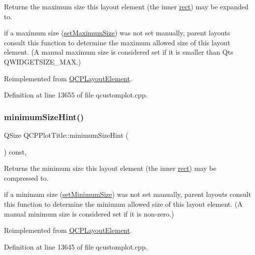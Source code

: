Returns the maximum size this layout element (the inner \hyperlink{class_q_c_p_layout_element_a208effccfe2cca4a0eaf9393e60f2dd4}{rect}) may be expanded to.

if a maximum size (\hyperlink{class_q_c_p_layout_element_a74eb5280a737ab44833d506db65efd95}{set\+Maximum\+Size}) was not set manually, parent layouts consult this function to determine the maximum allowed size of this layout element. (A manual maximum size is considered set if it is smaller than Qt\textquotesingle{}s Q\+W\+I\+D\+G\+E\+T\+S\+I\+Z\+E\+\_\+\+M\+AX.) 

Reimplemented from \hyperlink{class_q_c_p_layout_element_ab5ce2ba22b36d9a3b70a1be562c326e5}{Q\+C\+P\+Layout\+Element}.



Definition at line 13655 of file qcustomplot.\+cpp.

\mbox{\label{class_q_c_p_plot_title_aeed5454134516655723bf2d0499dea24}} 
\subsubsection{\texorpdfstring{minimum\+Size\+Hint()}{minimumSizeHint()}}
{\footnotesize\ttfamily Q\+Size Q\+C\+P\+Plot\+Title\+::minimum\+Size\+Hint (\begin{DoxyParamCaption}{ }\end{DoxyParamCaption}) const\hspace{0.3cm}{\ttfamily [protected]}, {\ttfamily [virtual]}}

Returns the minimum size this layout element (the inner \hyperlink{class_q_c_p_layout_element_a208effccfe2cca4a0eaf9393e60f2dd4}{rect}) may be compressed to.

if a minimum size (\hyperlink{class_q_c_p_layout_element_a5dd29a3c8bc88440c97c06b67be7886b}{set\+Minimum\+Size}) was not set manually, parent layouts consult this function to determine the minimum allowed size of this layout element. (A manual minimum size is considered set if it is non-\/zero.) 

Reimplemented from \hyperlink{class_q_c_p_layout_element_ab3fdb5c9a5189bb2dac10d4d25329cd8}{Q\+C\+P\+Layout\+Element}.



Definition at line 13645 of file qcustomplot.\+cpp.

